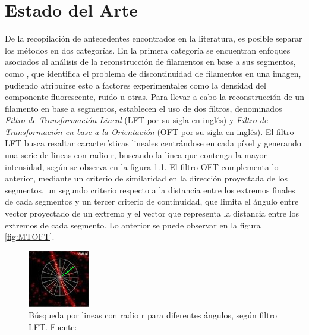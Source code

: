 \chapter{Estado del Arte}
\label{chap:stateoftheart}
De la recopilaci\'on de antecedentes encontrados en la literatura, es posible separar los m\'etodos en dos categor\'ias. En la primera categor\'ia se encuentran enfoques asociados al an\'alisis de la reconstrucci\'on de filamentos en base a sus segmentos, como \cite{zhang2017extracting}, que identifica el problema de discontinuidad de filamentos en una imagen, pudiendo atribuirse esto a factores experimentales como la densidad del componente fluorescente, ruido u otras. Para llevar a cabo la reconstrucci\'on de un filamento en base a segmentos, establecen el uso de dos filtros, denominados \textit{Filtro de Transformaci\'on Lineal} (LFT por su sigla en ingl\'es) y \textit{Filtro de Transformaci\'on en base a la Orientaci\'on} (OFT por su sigla en ingl\'es). 
El filtro LFT busca resaltar caracter\'isticas lineales centr\'andose en cada p\'ixel y generando una serie de lineas con radio r, buscando la linea que contenga la mayor intensidad, seg\'un se observa en la figura \ref{fig:MTLFT}. El filtro OFT complementa lo anterior, mediante un criterio de similaridad en la direcci\'on proyectada de los segmentos, un segundo criterio respecto a la distancia entre los extremos finales de cada segmentos y un tercer criterio de continuidad, que limita el \'angulo entre vector proyectado de un extremo y el vector que representa la distancia entre los extremos de cada segmento. Lo anterior se puede observar en la figura \ref{fig:MTOFT}.

\begin{figure}[h]
        \centering
        \includegraphics[scale=5]{imagenes/MT-LFT.jpeg}
        \caption{B\'usqueda por lineas con radio r para diferentes \'angulos, según filtro LFT. Fuente: \cite{zhang2017extracting}}
        \label{fig:MTLFT}
\end{figure}

